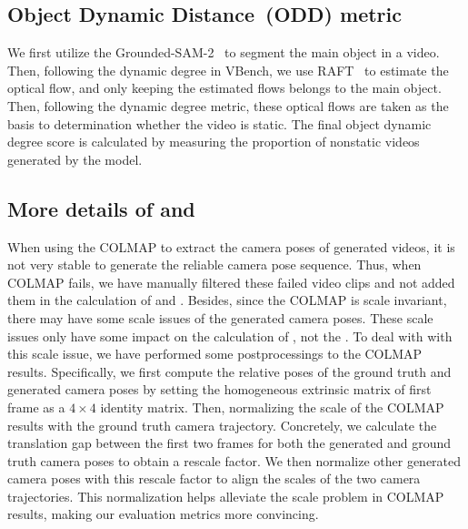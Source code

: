 \subsection{Object Dynamic Distance~(ODD) metric} \label{suppsubsec: object dynamic degree}
We first utilize the Grounded-SAM-2~\citep{ren2024grounded} to segment the main object in a video. 
%
Then, following the dynamic degree in VBench, we use RAFT~\citep{raft} to estimate the optical flow, and only keeping the estimated flows belongs to the main object.
%
Then, following the dynamic degree metric, these optical flows are taken as the basis to determination whether the video is static.
%
The final object dynamic degree score is calculated by measuring the proportion of nonstatic videos generated by the model.

\subsection{More details of \rote and \te}
\label{suppsubsec: more_detail_rote_te}
When using the COLMAP to extract the camera poses of generated videos, it is not very stable to generate the reliable camera pose sequence.
%
Thus, when COLMAP fails, we have manually filtered these failed video clips and not added them in the calculation of \rote and \te.
%
Besides, since the COLMAP is scale invariant, there may have some scale issues of the generated camera poses.
%
These scale issues only have some impact on the calculation of \te, not the \rote.
%
To deal with with this scale issue, we have performed some postprocessings to the COLMAP results.
%
Specifically, we first compute the relative poses of the ground truth and generated camera poses by setting the homogeneous extrinsic matrix of first frame as a $4 \times 4$ identity matrix.
%
Then, normalizing the scale of the COLMAP results with the ground truth camera trajectory.
%
Concretely, we calculate the translation gap between the first two frames for both the generated and ground truth camera poses to obtain a rescale factor.
%
We then normalize other generated camera poses with this rescale factor to align the scales of the two camera trajectories. 
%
This normalization helps alleviate the scale problem in COLMAP results, making our evaluation metrics more convincing.


